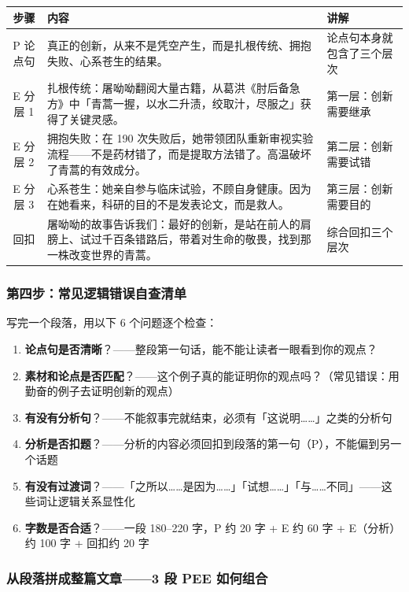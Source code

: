 \begin{center}
\begin{tabular}{c|l|l}
\textbf{步骤} & \textbf{内容} & \textbf{讲解} \\ \hline
P 论点句 & 真正的创新，从来不是凭空产生，而是扎根传统、拥抱失败、心系苍生的结果。 & 论点句本身就包含了三个层次 \\
E 分层 1 & 扎根传统：屠呦呦翻阅大量古籍，从葛洪《肘后备急方》中「青蒿一握，以水二升渍，绞取汁，尽服之」获得了关键灵感。 & 第一层：创新需要继承 \\
E 分层 2 & 拥抱失败：在 190 次失败后，她带领团队重新审视实验流程——不是药材错了，而是提取方法错了。高温破坏了青蒿的有效成分。 & 第二层：创新需要试错 \\
E 分层 3 & 心系苍生：她亲自参与临床试验，不顾自身健康。因为在她看来，科研的目的不是发表论文，而是救人。 & 第三层：创新需要目的 \\
回扣 & 屠呦呦的故事告诉我们：最好的创新，是站在前人的肩膀上、试过千百条错路后，带着对生命的敬畏，找到那一株改变世界的青蒿。 & 综合回扣三个层次 \\
\end{tabular}
\end{center}

\subsubsection{第四步：常见逻辑错误自查清单}

写完一个段落，用以下 6 个问题逐个检查：

\begin{enumerate}
  \item \textbf{论点句是否清晰}？——整段第一句话，能不能让读者一眼看到你的观点？
  \item \textbf{素材和论点是否匹配}？——这个例子真的能证明你的观点吗？（常见错误：用勤奋的例子去证明创新的观点）
  \item \textbf{有没有分析句}？——不能叙事完就结束，必须有「这说明……」之类的分析句
  \item \textbf{分析是否扣题}？——分析的内容必须回扣到段落的第一句（P），不能偏到另一个话题
  \item \textbf{有没有过渡词}？——「之所以……是因为……」「试想……」「与……不同」——这些词让逻辑关系显性化
  \item \textbf{字数是否合适}？——一段 180--220 字，P 约 20 字 + E 约 60 字 + E（分析）约 100 字 + 回扣约 20 字
\end{enumerate}

\subsubsection{从段落拼成整篇文章——3 段 PEE 如何组合}

